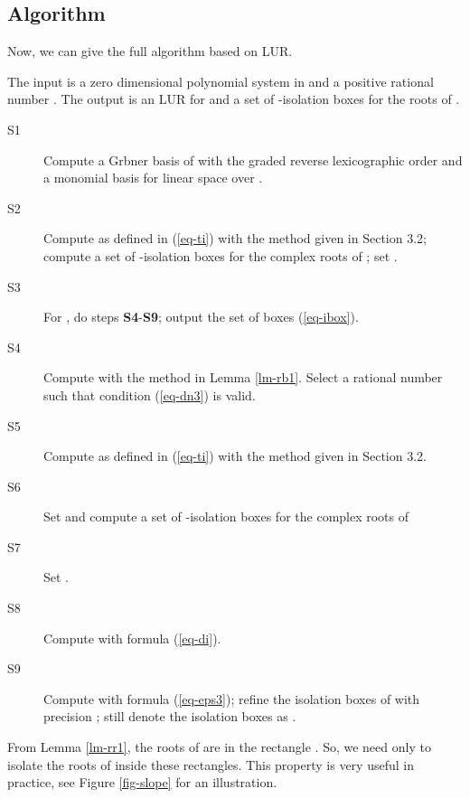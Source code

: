 \documentclass[amsthm]{JSC_LaTex_2007_Mar_12/elsart}
\def\bref#1{(\ref{#1})}
\begin{document}
\subsection{Algorithm}

Now, we can give the full algorithm based on LUR.

\begin{alg} \label{alg-1}
The input is a zero dimensional polynomial system
 in  and a positive
rational number . The output is an LUR for  and a set
of -isolation boxes for the roots of .
\end{alg}

\begin{description}
\item[S1]
Compute a Grbner basis  of  with the graded
reverse lexicographic order and a monomial basis  for linear
space  over .

\item[S2]
Compute  as defined in \bref{eq-ti} with the method given in
Section 3.2; compute a set of -isolation boxes
 for the complex roots of ; set  .

\item[S3]
For , do steps  {\bf S4}-{\bf S9}; output the set of
boxes \bref{eq-ibox}.

\item[S4]
Compute  with the method in Lemma
\ref{lm-rb1}. Select a rational number  such that condition
\bref{eq-dn3} is valid.

\item[S5]
Compute  as defined in \bref{eq-ti} with the method
given in Section 3.2.

\item[S6]
Set  and compute a set of
-isolation boxes  for the
complex roots of 

\item[S7]
Set .

\item[S8]
Compute  with formula \bref{eq-di}.

\item[S9]
Compute  with formula \bref{eq-eps3}; refine the
isolation boxes  of  with precision
; still denote the isolation boxes as .

\end{description}

\begin{rem}
From Lemma \ref{lm-rr1}, the roots of  are in the
rectangle .
So, we need only to isolate the roots of  inside these
rectangles. This property is very useful in practice, see Figure
\ref{fig-slope} for an illustration.
\end{rem}
\end{document}
